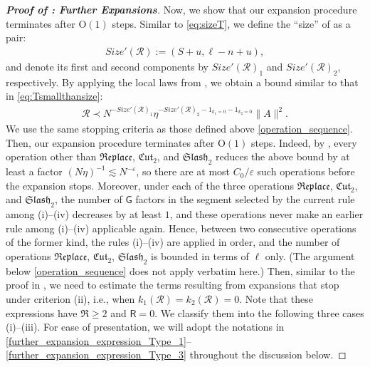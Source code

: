 \documentclass[10pt,reqno]{amsart}
\numberwithin{equation}{section}
\numberwithin{figure}{section}
\theoremstyle{plain} %
\theoremstyle{definition} %
\newcommand{\cW}{{\mathcal W}}
\newcommand{\cR}{{\mathcal R}}
\newcommand{\fR}{\mathfrak R}
\newcommand{\sG}{\mathsf G}
\newcommand{\sR}{\mathsf R}
\renewcommand{\geq}{\ge}
\newcommand{\pa}[1]{\left({#1}\right)}
\newcommand{\norm}[1]{\lVert #1 \rVert}
\newcommand{\isize}{\mathit{Size}}
\newcommand{\freplace}{\mathfrak{Replace}}
\newcommand{\fcut}[1]{\mathfrak{Cut}_{#1}}
\newcommand{\fslash}[1]{\mathfrak{Slash}_{#1}}
\newcommand{\e}{{\varepsilon}}
\newcommand{\OO}{\mathrm{O}}
\newcommand{\mm}{\ell}
\numberwithin{equation}{section}
\begin{document}
\begin{proof}[\bf Proof of : Further Expansions]
Now, we show that our expansion procedure terminates after $\OO\pa{1}$ steps. Similar to \eqref{eq:sizeT}, we define the ``size'' of \smash{$\cR=c_\cR\cdot \cW^{\pa{u}}\Upsilon_n^{\pa{\mm}}$} as a pair:
    \begin{equation}\nonumber
        \begin{aligned}
            \isize'\pa{\cR}:=\pa{S+u,\mm-n+u},
        \end{aligned}
    \end{equation}
and denote its first and second components by $\isize'(\cR)_1$ and $\isize'(\cR)_2$, respectively. By applying the local laws from , we obtain a bound similar to that in \eqref{eq:Tsmallthansize}: 
    \begin{equation}\nonumber
        \begin{aligned}
            \cR\prec N^{-\isize'\pa{\cR}_1}\eta^{-\isize'\pa{\cR}_2-1_{k_1=0}-1_{k_2=0}}\norm{A}^2.
        \end{aligned}
    \end{equation}
We use the same stopping criteria as those defined above \eqref{operation_sequence}. Then, our expansion procedure terminates after $\OO\pa{1}$ steps. Indeed, by , every operation other than $\freplace$, $\fcut{2}$, and $\fslash{2}$ reduces the above bound by at least a factor $(N\eta)^{-1}\lesssim N^{-\e}$, so there are at most $C_0/\e$ such operations before the expansion stops. Moreover, under each of the three operations $\freplace$, $\fcut{2}$, and $\fslash{2}$, the number of $\sG$ factors in the segment selected by the current rule among (i)--(iv) decreases by at least $1$, and these operations never make an earlier rule among (i)--(iv) applicable again. Hence, between two consecutive operations of the former kind, the rules (i)--(iv) are applied in order, and the number of operations $\freplace$, $\fcut{2}$, $\fslash{2}$ is bounded in terms of $\mm$ only. (The argument below \eqref{operation_sequence} does not apply verbatim here.) 
    Then, similar to the proof in , we need to estimate the terms resulting from expansions that stop under criterion (ii), i.e., when $k_1(\cR)=k_2(\cR)=0$. Note that these expressions have $\fR\geq 2$ and $\sR=0$. We classify them into the following three cases (i)--(iii). For ease of presentation, we will adopt the notations in \eqref{further_expansion_expression_Type_1}--\eqref{further_expansion_expression_Type_3} throughout the discussion below.
    

\end{proof}
\end{document}

